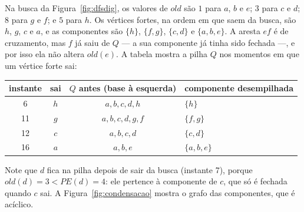 \begin{exemplo}\label{ex:cfc}
Na busca da Figura~\ref{fig:dfsdig}, os valores de $old$ são $1$ para $a$, $b$ e $e$; $3$ para $c$ e $d$; $8$ para $g$ e $f$; e $5$ para $h$. Os vértices fortes, na ordem em que saem da busca, são $h$, $g$, $c$ e $a$, e as componentes são $\{h\}$, $\{f,g\}$, $\{c,d\}$ e $\{a,b,e\}$. A aresta $ef$ é de cruzamento, mas $f$ já saiu de $Q$ --- a sua componente já tinha sido fechada ---, e por isso ela não altera $old(e)$. A tabela mostra a pilha $Q$ nos momentos em que um vértice forte sai:
\begin{center}\small
\begin{tabular}{@{}cccl@{}}
\toprule
instante & sai & $Q$ antes (base à esquerda) & componente desempilhada\\
\midrule
6 & $h$ & $a,b,c,d,h$ & $\{h\}$\\
11 & $g$ & $a,b,c,d,g,f$ & $\{f,g\}$\\
12 & $c$ & $a,b,c,d$ & $\{c,d\}$\\
16 & $a$ & $a,b,e$ & $\{a,b,e\}$\\
\bottomrule
\end{tabular}
\end{center}
Note que $d$ fica na pilha depois de sair da busca (instante 7), porque $old(d)=3<PE(d)=4$: ele pertence à componente de $c$, que só é fechada quando $c$ sai. A Figura~\ref{fig:condensacao} mostra o grafo das componentes, que é acíclico.
\begin{figura}
\end{figura}
\end{exemplo}

